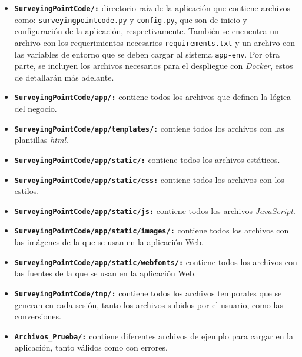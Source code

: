 \begin{itemize}

\item \texttt{\textbf{SurveyingPointCode/:}} directorio raíz de la aplicación que contiene archivos como: \texttt{surveyingpointcode.py} y \texttt{config.py}, que son de inicio y configuración de la aplicación, respectivamente. También se encuentra un archivo con los requerimientos necesarios \texttt{requirements.txt} y un archivo con las variables de entorno que se deben cargar al sistema \texttt{app-env}. Por otra parte, se incluyen los archivos necesarios para el despliegue con \emph{Docker}, estos de detallarán más adelante.

\item \texttt{\textbf{SurveyingPointCode/app/:}} contiene todos los archivos que definen la lógica del negocio. 

\item \texttt{\textbf{SurveyingPointCode/app/templates/:}} contiene todos los archivos con las plantillas \emph{ html}. 

\item \texttt{\textbf{SurveyingPointCode/app/static/:}} contiene todos los archivos estáticos.

\item \texttt{\textbf{SurveyingPointCode/app/static/css:}} contiene todos los archivos con los estilos.

\item \texttt{\textbf{SurveyingPointCode/app/static/js:}} contiene todos los archivos \emph{JavaScript}.

\item \texttt{\textbf{SurveyingPointCode/app/static/images/:}} contiene todos los archivos con las imágenes de la que se usan en la aplicación Web.

\item \texttt{\textbf{SurveyingPointCode/app/static/webfonts/:}} contiene todos los archivos con las fuentes de la que se usan en la aplicación Web.

\item \texttt{\textbf{SurveyingPointCode/tmp/:}} contiene todos los archivos temporales que se generan en cada sesión, tanto los archivos subidos por el usuario, como las conversiones.

\item \texttt{\textbf{Archivos\_Prueba/:}} contiene diferentes archivos de ejemplo para cargar en la aplicación, tanto válidos como con errores.


\end{itemize}

